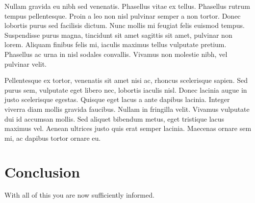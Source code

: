 \documentclass[%
  a4paper,
  10pt,
  version=last
]{scrartcl}
\begin{document}
  Nullam gravida eu nibh sed venenatis. Phasellus vitae ex tellus. Phasellus
  rutrum tempus pellentesque. Proin a leo non nisl pulvinar semper a non
  tortor.  Donec lobortis purus sed facilisis dictum. Nunc mollis mi feugiat
  felis euismod tempus. Suspendisse purus magna, tincidunt sit amet sagittis
  sit amet, pulvinar non lorem. Aliquam finibus felis mi, iaculis maximus
  tellus vulputate pretium.  Phasellus ac urna in nisl sodales convallis.
  Vivamus non molestie nibh, vel pulvinar velit.

  Pellentesque ex tortor, venenatis sit amet nisi ac, rhoncus scelerisque
  sapien.  Sed purus sem, vulputate eget libero nec, lobortis iaculis nisl.
  Donec lacinia augue in justo scelerisque egestas. Quisque eget lacus a ante
  dapibus lacinia.  Integer viverra diam mollis gravida faucibus. Nullam in
  fringilla velit.  Vivamus vulputate dui id accumsan mollis. Sed aliquet
  bibendum metus, eget tristique lacus maximus vel. Aenean ultrices justo quis
  erat semper lacinia.  Maecenas ornare sem mi, ac dapibus tortor ornare eu.

  \section{Conclusion}
  With all of this you are now sufficiently informed.
\end{document}
